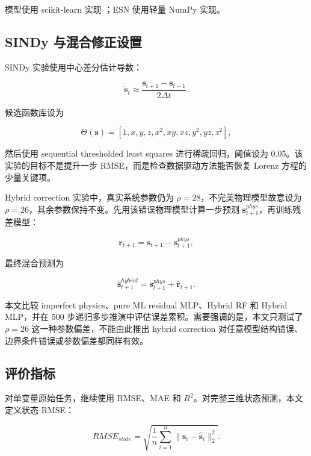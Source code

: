 \documentclass[UTF8,a4paper,12pt]{ctexart}
\begin{document}
模型使用 scikit-learn 实现 \cite{pedregosa2011}；ESN 使用轻量 NumPy 实现。

\subsection{SINDy 与混合修正设置}

SINDy 实验使用中心差分估计导数：

\begin{equation}
\dot{\mathbf{s}}_t\approx\frac{\mathbf{s}_{t+1}-\mathbf{s}_{t-1}}{2\Delta t}.
\end{equation}

候选函数库设为

\begin{equation}
\Theta(\mathbf{s})=[1,x,y,z,x^2,xy,xz,y^2,yz,z^2],
\end{equation}

然后使用 sequential thresholded least squares 进行稀疏回归，阈值设为 0.05。该实验的目标不是提升一步 RMSE，而是检查数据驱动方法能否恢复 Lorenz 方程的少量关键项。

Hybrid correction 实验中，真实系统参数仍为 $\rho=28$，不完美物理模型故意设为 $\rho=26$，其余参数保持不变。先用该错误物理模型计算一步预测 $\mathbf{s}^{phys}_{t+1}$，再训练残差模型：

\begin{equation}
\mathbf{r}_{t+1}=\mathbf{s}_{t+1}-\mathbf{s}^{phys}_{t+1},
\end{equation}

最终混合预测为

\begin{equation}
\hat{\mathbf{s}}^{hybrid}_{t+1}=\mathbf{s}^{phys}_{t+1}+\hat{\mathbf{r}}_{t+1}.
\end{equation}

本文比较 imperfect physics、pure ML residual MLP、Hybrid RF 和 Hybrid MLP，并在 500 步递归多步推演中评估误差累积。需要强调的是，本文只测试了 $\rho=26$ 这一种参数偏差，不能由此推出 hybrid correction 对任意模型结构错误、边界条件错误或参数偏差都同样有效。

\subsection{评价指标}

对单变量原始任务，继续使用 RMSE、MAE 和 $R^2$。对完整三维状态预测，本文定义状态 RMSE：

\begin{equation}
RMSE_{state}=\sqrt{\frac{1}{n}\sum_{i=1}^{n}\|\mathbf{s}_i-\hat{\mathbf{s}}_i\|_2^2}.
\end{equation}
\end{document}
